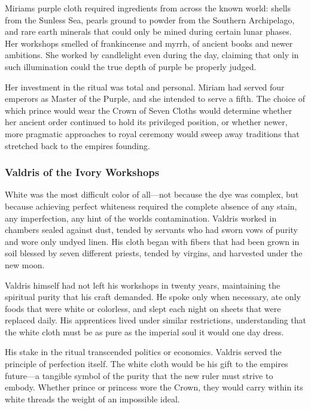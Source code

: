 Miriam\textquotesingle s purple cloth required ingredients from across
the known world: shells from the Sunless Sea, pearls ground to powder
from the Southern Archipelago, and rare earth minerals that could only
be mined during certain lunar phases. Her workshops smelled of
frankincense and myrrh, of ancient books and newer ambitions. She worked
by candlelight even during the day, claiming that only in such
illumination could the true depth of purple be properly judged.

Her investment in the ritual was total and personal. Miriam had served
four emperors as Master of the Purple, and she intended to serve a
fifth. The choice of which prince would wear the Crown of Seven Cloths
would determine whether her ancient order continued to hold its
privileged position, or whether newer, more pragmatic approaches to
royal ceremony would sweep away traditions that stretched back to the
empire\textquotesingle s founding.

\subsubsection{Valdris of the Ivory
Workshops}\label{valdris-of-the-ivory-workshops}

White was the most difficult color of all---not because the dye was
complex, but because achieving perfect whiteness required the complete
absence of any stain, any imperfection, any hint of the
world\textquotesingle s contamination. Valdris worked in chambers sealed
against dust, tended by servants who had sworn vows of purity and wore
only undyed linen. His cloth began with fibers that had been grown in
soil blessed by seven different priests, tended by virgins, and
harvested under the new moon.

Valdris himself had not left his workshops in twenty years, maintaining
the spiritual purity that his craft demanded. He spoke only when
necessary, ate only foods that were white or colorless, and slept each
night on sheets that were replaced daily. His apprentices lived under
similar restrictions, understanding that the white cloth must be as pure
as the imperial soul it would one day dress.

His stake in the ritual transcended politics or economics. Valdris
served the principle of perfection itself. The white cloth would be his
gift to the empire\textquotesingle s future---a tangible symbol of the
purity that the new ruler must strive to embody. Whether prince or
princess wore the Crown, they would carry within its white threads the
weight of an impossible ideal.

